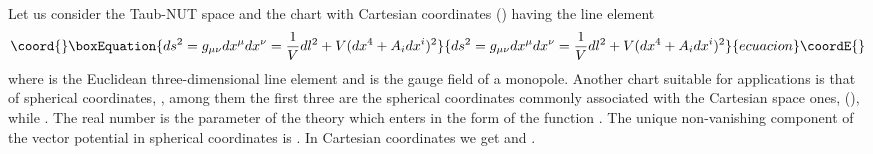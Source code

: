 \documentclass[a4paper,12pt]{article}
\begin{document}
Let us consider the Taub-NUT space and the chart with Cartesian coordinates 
\coordHE{}  (\coordHE{}) having the line element  
\begin{equation}\coord{}\boxEquation{\label{(met)} 
ds^{2}=g_{\mu\nu}dx^{\mu}dx^{\nu}=\frac{1}{V}dl^{2}+V(dx^{4}+
A_{i}dx^{i})^{2}
}{ds^{2}=g_{\mu\nu}dx^{\mu}dx^{\nu}=\frac{1}{V}dl^{2}+V(dx^{4}+
A_{i}dx^{i})^{2}
}{ecuacion}\coordE{}\end{equation}   
where \coordHE{}
is the  Euclidean three-dimen\-sio\-nal line element and \coordHE{} is 
the gauge field of a monopole. Another chart 
suitable for applications is that of spherical coordinates, \coordHE{}, among them the first three are the  
spherical coordinates commonly associated with the  Cartesian space 
ones, \coordHE{}  (\coordHE{}), while 
\coordHE{}. The real number \myHighlight{$\mu$}\coordHE{} is the  parameter of the 
theory which enters in the form of the function \coordHE{}. 
The unique non-vanishing component of the vector potential in 
spherical coordinates is \coordHE{}. In Cartesian 
coordinates we get  \coordHE{} and \coordHE{}.
\end{document}
